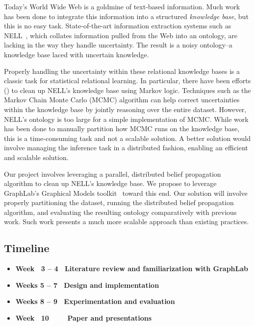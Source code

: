 Today's World Wide Web is a goldmine of text-based information.
Much work has been done to integrate this information into a structured
\emph{knowledge base}, but this is no easy task.
State-of-the-art information extraction systems such as NELL~\cite{carlson2010toward},
which collates information pulled from the Web into an ontology,
are lacking in the way they handle uncertainty.
The result is a noisy ontology--a knowledge base laced with uncertain knowledge.

Properly handling the uncertainty within these relational knowledge bases
is a classic task for statistical relational learning.
In particular, there have been efforts (\cite{lao2011random}) to clean up NELL's knowledge base
using Markov logic.
Techniques such as the Markov Chain Monte Carlo (MCMC) algorithm can help correct
uncertainties within the knowledge base by jointly reasoning over the entire dataset.
However, NELL's ontology is too large for a simple implementation of MCMC.
While work has been done to manually partition how MCMC runs on the knowledge base,
this is a time-consuming task and not a scalable solution.
A better solution would involve managing the inference task in a distributed fashion,
enabling an efficient and scalable solution.

Our project involves leveraging a parallel, distributed belief propagation algorithm
to clean up NELL's knowledge base.
We propose to leverage GraphLab's Graphical Models toolkit~\cite{low2010graphlab} toward this end.
Our solution will involve properly partitioning the dataset,
running the distributed belief propagation algorithm,
and evaluating the resulting ontology comparatively with previous work.
Such work presents a much more scalable approach than existing practices.

\subsection*{Timeline}
\begin{itemize}
\item \bf Week ~3 -- 4  \rm~Literature review and familiarization with GraphLab
\item \bf Weeks 5 -- 7  \rm~Design and implementation
\item \bf Weeks 8 -- 9  \rm~Experimentation and evaluation
\item \bf Week ~10~~~ \rm~Paper and presentations
\end{itemize}


